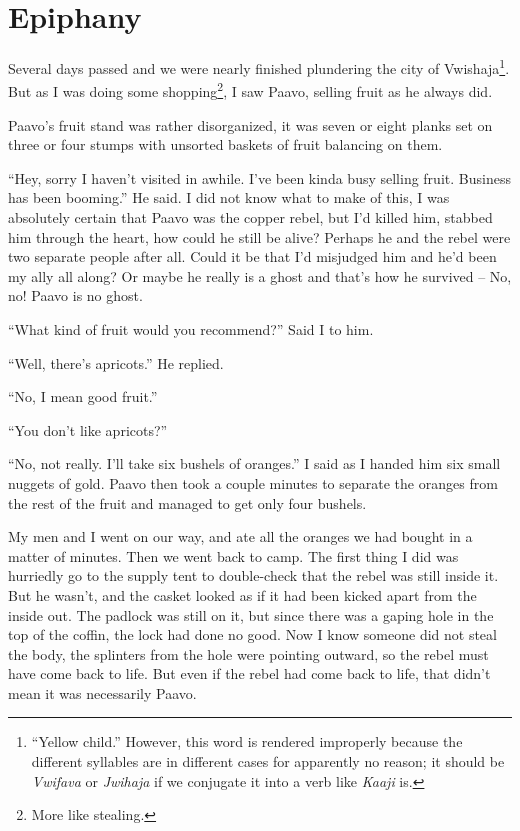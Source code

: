 \chapter{Epiphany}

Several days passed and we were nearly finished plundering the city of Vwishaja\footnote{``Yellow child.'' However, this word is rendered improperly because the different syllables are in different cases for apparently no reason; it should be \emph{Vwifava} or \emph{Jwihaja} if we conjugate it into a verb like \emph{Kaaji} is.}. But as I was doing some shopping\footnote{More like stealing.}, I saw Paavo, selling fruit as he always did.

Paavo's fruit stand was rather disorganized, it was seven or eight planks set on three or four stumps with unsorted baskets of fruit balancing on them.

``Hey, sorry I haven't visited in awhile. I've been kinda busy selling fruit. Business has been booming.'' He said. I did not know what to make of this, I was absolutely certain that Paavo was the copper rebel, but I'd killed him, stabbed him through the heart, how could he still be alive?
Perhaps he and the rebel were two separate people after all.
Could it be that I'd misjudged him and he'd been my ally all along?
Or maybe he really is a ghost and that's how he survived -- No, no! Paavo is no ghost.

``What kind of fruit would you recommend?'' Said I to him.

``Well, there's apricots.'' He replied.

``No, I mean good fruit.''

``You don't like apricots?''

``No, not really. I'll take six bushels of oranges.'' I said as I handed him six small nuggets of gold. Paavo then took a couple minutes to separate the oranges from the rest of the fruit and managed to get only four bushels.

My men and I went on our way, and ate all the oranges we had bought in a matter of minutes. Then we went back to camp. The first thing I did was hurriedly go to the supply tent to double-check that the rebel was still inside it. But he wasn't, and the casket looked as if it had been kicked apart from the inside out. The padlock was still on it, but since there was a gaping hole in the top of the coffin, the lock had done no good. Now I know someone did not steal the body, the splinters from the hole were pointing outward, so the rebel must have come back to life. But even if the rebel had come back to life, that didn't mean it was necessarily Paavo.


